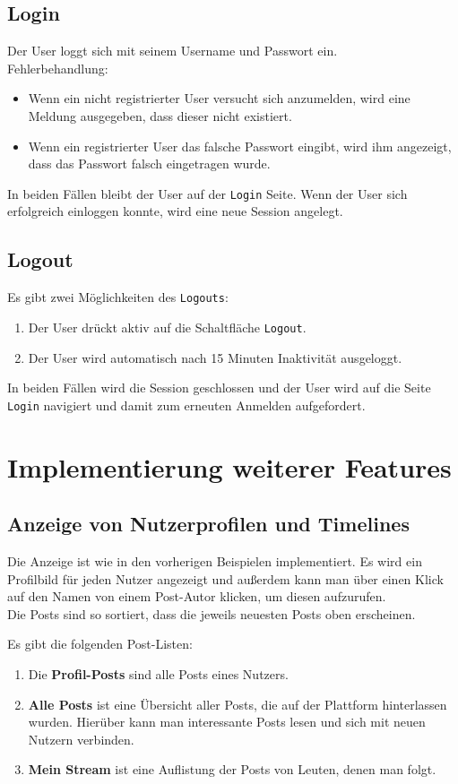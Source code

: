 \subsection{Login}
Der User loggt sich mit seinem Username und Passwort ein. \\
Fehlerbehandlung:
\begin{itemize}
  \item Wenn ein nicht registrierter User versucht sich anzumelden, wird eine Meldung ausgegeben, dass dieser nicht existiert.
  \item Wenn ein registrierter User das falsche Passwort eingibt, wird ihm angezeigt, dass das Passwort falsch eingetragen wurde.
\end{itemize}
In beiden Fällen bleibt der User auf der \texttt{Login} Seite.
Wenn der User sich erfolgreich einloggen konnte, wird eine neue Session angelegt.

\subsection{Logout}
Es gibt zwei Möglichkeiten des \texttt{Logouts}:
\begin{enumerate}
  \item Der User drückt aktiv auf die Schaltfläche \texttt{Logout}.
  \item Der User wird automatisch nach 15 Minuten Inaktivität ausgeloggt.
\end{enumerate}
In beiden Fällen wird die Session geschlossen und der User wird auf die Seite \texttt{Login} navigiert und damit zum erneuten Anmelden aufgefordert.

\newpage
\section{Implementierung weiterer Features}
\subsection{Anzeige von Nutzerprofilen und Timelines}
Die Anzeige ist wie in den vorherigen Beispielen implementiert. Es wird ein Profilbild für jeden Nutzer angezeigt und außerdem kann man über einen Klick auf den Namen von einem Post-Autor klicken, um diesen aufzurufen.\\
Die Posts sind so sortiert, dass die jeweils neuesten Posts oben erscheinen.

Es gibt die folgenden Post-Listen:
\begin{enumerate}
\item Die \textbf{Profil-Posts} sind alle Posts eines Nutzers.
\item \textbf{Alle Posts} ist eine Übersicht aller Posts, die auf der Plattform hinterlassen wurden. Hierüber kann man interessante Posts lesen und sich mit neuen Nutzern verbinden.
\item \textbf{Mein Stream} ist eine Auflistung der Posts von Leuten, denen man folgt.
\end{enumerate}

